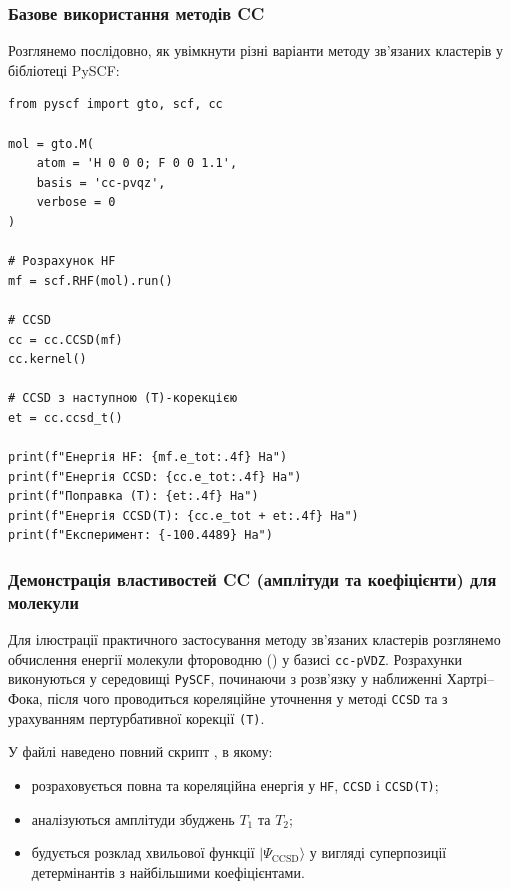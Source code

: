 \subsubsection{Базове використання методів CC}

Розглянемо послідовно, як увімкнути різні варіанти методу зв'язаних кластерів
у бібліотеці PySCF:

\begin{verbatim}
from pyscf import gto, scf, cc

mol = gto.M(
    atom = 'H 0 0 0; F 0 0 1.1',
    basis = 'cc-pvqz',
    verbose = 0
)

# Розрахунок HF
mf = scf.RHF(mol).run()

# CCSD
cc = cc.CCSD(mf)
cc.kernel()

# CCSD з наступною (T)-корекцією
et = cc.ccsd_t()

print(f"Енергія HF: {mf.e_tot:.4f} Ha")
print(f"Енергія CCSD: {cc.e_tot:.4f} Ha")
print(f"Поправка (T): {et:.4f} Ha")
print(f"Енергія CCSD(T): {cc.e_tot + et:.4f} Ha")
print(f"Експеримент: {-100.4489} Ha")
\end{verbatim}


\subsubsection{Демонстрація властивостей CC (амплітуди та коефіцієнти) для молекули }

Для ілюстрації практичного застосування методу зв'язаних кластерів
розглянемо обчислення енергії молекули фтороводню  () у базисі \texttt{cc-pVDZ}.
Розрахунки виконуються у середовищі \texttt{PySCF}, починаючи з
розв’язку у наближенні Хартрі–Фока, після чого проводиться
кореляційне уточнення у методі \texttt{CCSD} та з урахуванням
пертурбативної корекції \texttt{(T)}.

У файлі наведено повний скрипт , в якому:
\begin{itemize}
    \item розраховується повна та кореляційна енергія у \texttt{HF}, \texttt{CCSD} і \texttt{CCSD(T)};
    \item аналізуються амплітуди збуджень \( T_1 \) та \( T_2 \);
    \item будується розклад хвильової функції \(|\Psi_{\text{CCSD}}\rangle\)
    у вигляді суперпозиції детермінантів з найбільшими коефіцієнтами.
\end{itemize}



